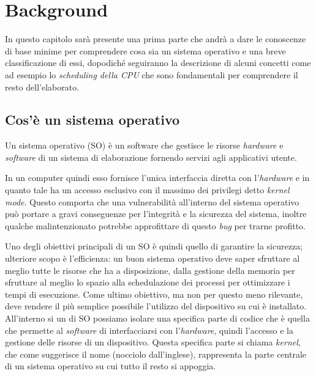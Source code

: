 \chapter{Background}
In questo capitolo sarà presente una prima parte che andrà a dare le conoscenze di base minime per comprendere cosa sia un sistema operativo e una breve classificazione di essi, dopodiché seguiranno la descrizione di alcuni concetti come ad esempio lo \textit{scheduling della CPU} che sono fondamentali per comprendere il resto dell'elaborato.

\section{Cos'è un sistema operativo}
Un sistema operativo (SO) è un software che gestisce le risorse \textit{hardware} e \textit{software} di un sistema di elaborazione fornendo servizi agli applicativi utente.

In un computer quindi esso fornisce l'unica interfaccia diretta con l'\textit{hardware} e in quanto tale ha un accesso esclusivo con il massimo dei privilegi detto \textit{kernel mode}. Questo comporta che una vulnerabilità all'interno del sistema operativo può portare a gravi conseguenze per l'integrità e la sicurezza del sistema, inoltre qualche malintenzionato potrebbe approfittare di questo \textit{bug} per trarne profitto.

Uno degli obiettivi principali di un SO è quindi quello di garantire la sicurezza; ulteriore scopo è l'efficienza: un buon sistema operativo deve saper sfruttare al meglio tutte le risorse che ha a disposizione, dalla gestione della memoria per sfruttare al meglio lo spazio alla schedulazione dei processi per ottimizzare i tempi di esecuzione. Come ultimo obiettivo, ma non per questo meno rilevante, deve rendere il più semplice possibile l'utilizzo del dispositivo su cui è installato.
All'interno si un di SO possiamo isolare una specifica parte di codice che è quella che permette al \textit{software} di interfacciarsi con l'\textit{hardware}, quindi l'accesso e la gestione delle risorse di un dispositivo. Questa specifica parte si chiama \textit{kernel}, che come suggerisce il nome (nocciolo dall'inglese), rappresenta la parte centrale di un sistema operativo su cui tutto il resto si appoggia.
\newpage

